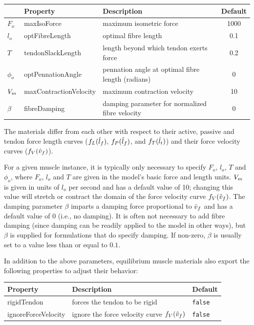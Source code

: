 \begin{center}
\begin{tabular}{|l|l|l|c|} 
\hline
& Property & Description & Default\\
\hline
$F_{o}$ & {\sf maxIsoForce} & 
maximum isometric force & 1000 \\
$l_o$ & {\sf optFibreLength} & 
optimal fibre length & 0.1 \\
$T$ & {\sf tendonSlackLength} & 
length beyond which tendon exerts force & 0.2 \\
$\phi_o$ & {\sf optPennationAngle} & 
pennation angle at optimal fibre length (radians) & 0 \\
$V_{m}$ & {\sf maxContractionVelocity} & 
maximum contraction velocity & 10 \\
$\beta$ & {\sf fibreDamping} & 
damping parameter for normalized fibre velocity & 0 \\
\hline
\end{tabular}
\end{center}

The materials differ from each other with respect to their active,
passive and tendon force length curves ($f_L(\hat{l}_f)$, $f_P(\hat{l}_f)$, and
$f_T(\hat{l}_t)$) and their force velocity curves ($f_V(\hat{v}_f)$).

For a given muscle instance, it is typically only necessary to specify
$F_o$, $l_o$, $T$ and $\phi_o$, where $F_o$, $l_o$ and $T$ are given
in the model's basic force and length units. $V_{m}$ is given in units
of $l_o$ per second and has a default value of 10; changing this value
will stretch or contract the domain of the force velocity curve
$f_V(\hat{v}_f)$. The damping parameter $\beta$ imparts a damping force
proportional to $\hat{v}_f$ and has a default value of 0 (i.e., no
damping). It is often not necessary to add fibre damping (since
damping can be readily applied to the model in other ways), but
$\beta$ is supplied for formulations that do specify damping.  If
non-zero, $\beta$ is usually set to a value less than or equal to
$0.1$.

In addition to the above parameters, equilibrium muscle materials also
export the following properties to adjust their behavior:

\begin{center}
\begin{tabular}{|l|l|l|} 
\hline
Property & Description & Default \\
\hline
{\sf rigidTendon} & forces the tendon to be rigid & {\tt false} \\
{\sf ignoreForceVelocity} & 
ignore the force velocity curve $f_V(\hat{v}_f)$ & {\tt false} \\
\hline
\end{tabular}
\end{center}

